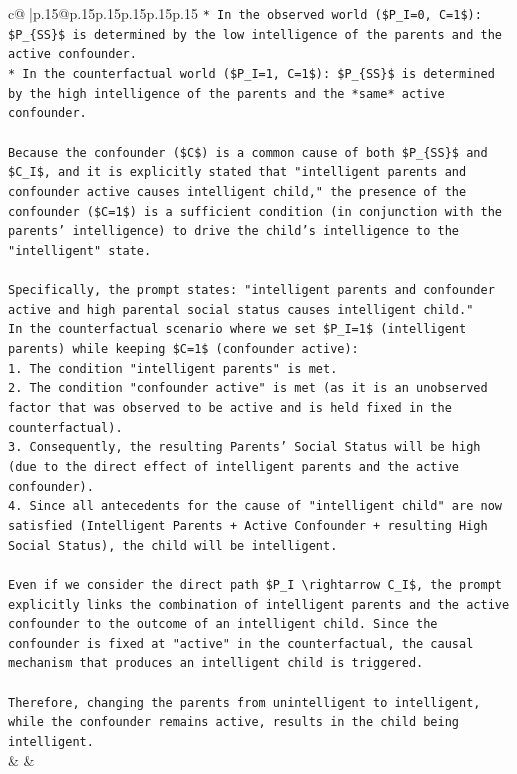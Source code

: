 \documentclass{article}
\begin{document}
{\begin{supertabular}{c@{$\;$}|p{.15\linewidth}@{}p{.15\linewidth}p{.15\linewidth}p{.15\linewidth}p{.15\linewidth}p{.15\linewidth}}
{{{\texttt{*   In the observed world (\$P\_I=0, C=1\$): \$P\_\{SS\}\$ is determined by the low intelligence of the parents and the active confounder.} \\
\texttt{*   In the counterfactual world (\$P\_I=1, C=1\$): \$P\_\{SS\}\$ is determined by the high intelligence of the parents and the *same* active confounder.} \\
\\ 
\texttt{Because the confounder (\$C\$) is a common cause of both \$P\_\{SS\}\$ and \$C\_I\$, and it is explicitly stated that "intelligent parents and confounder active causes intelligent child," the presence of the confounder (\$C=1\$) is a sufficient condition (in conjunction with the parents' intelligence) to drive the child's intelligence to the "intelligent" state.} \\
\\ 
\texttt{Specifically, the prompt states: "intelligent parents and confounder active and high parental social status causes intelligent child."} \\
\texttt{In the counterfactual scenario where we set \$P\_I=1\$ (intelligent parents) while keeping \$C=1\$ (confounder active):} \\
\texttt{1.  The condition "intelligent parents" is met.} \\
\texttt{2.  The condition "confounder active" is met (as it is an unobserved factor that was observed to be active and is held fixed in the counterfactual).} \\
\texttt{3.  Consequently, the resulting Parents' Social Status will be high (due to the direct effect of intelligent parents and the active confounder).} \\
\texttt{4.  Since all antecedents for the cause of "intelligent child" are now satisfied (Intelligent Parents + Active Confounder + resulting High Social Status), the child will be intelligent.} \\
\\ 
\texttt{Even if we consider the direct path \$P\_I \textbackslash{}rightarrow C\_I\$, the prompt explicitly links the combination of intelligent parents and the active confounder to the outcome of an intelligent child. Since the confounder is fixed at "active" in the counterfactual, the causal mechanism that produces an intelligent child is triggered.} \\
\\ 
\texttt{Therefore, changing the parents from unintelligent to intelligent, while the confounder remains active, results in the child being intelligent.} \\
            }
        }
    }
    & & \\ \\


\end{supertabular}}
\end{document}
